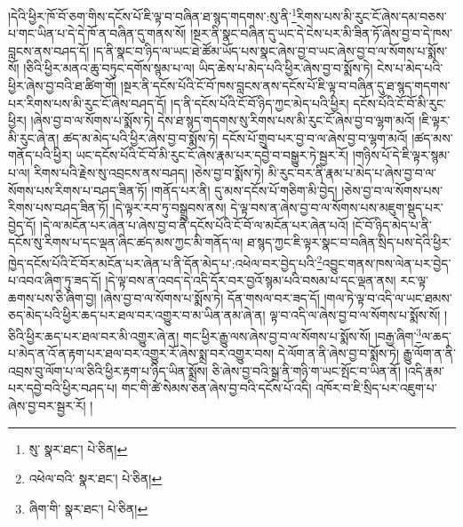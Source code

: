 །དེའི་ཕྱིར་ཁོ་བོ་ཅག་གིས་དངོས་པོ་ཇི་ལྟ་བ་བཞིན་ཐ་སྙད་གདགས་:སུ་ནི་\footnote{སུ་  སྣར་ཐང་།  པེ་ཅིན། }རིགས་པས་མི་རུང་ངོ་ཞེས་དམ་བཅས་པ་གང་ཡིན་པ་དེ་དེ་ཁོ་ན་བཞིན་དུ་གནས་སོ། །སྔར་ནི་སྣང་བཞིན་དུ་ཡང་དེ་ངེས་པར་མི་ཟིན་ཏོ་ཞེས་བྱ་བ་དེ་ཁས་བླངས་ནས་བཤད་དོ། །ད་ནི་སྣང་བ་ཉིད་ལ་ཡང་ཐེ་ཚོམ་ཡོད་པས་སྣང་ཞེས་བྱ་བ་ཡང་ཞེས་བྱ་བ་ལ་སོགས་པ་སྨོས་སོ། །ཅིའི་ཕྱིར་མནའ་ཆུ་བཏུང་དགོས་སྙམ་པ་ལ། ཡིད་ཆེས་པ་མེད་པའི་ཕྱིར་ཞེས་བྱ་བ་སྨོས་ཏེ། ངེས་པ་མེད་པའི་ཕྱིར་ཞེས་བྱ་བའི་ཐ་ཚིག་གོ། །སྔར་ནི་དངོས་པོའི་ངོ་བོ་ཁས་བླངས་ནས་དངོས་པོ་ཇི་ལྟ་བ་བཞིན་དུ་ཐ་སྙད་གདགས་པར་རིགས་པས་མི་རུང་ངོ་ཞེས་བཤད་དོ། །ད་ནི་དངོས་པོའི་ངོ་བོ་ཉིད་ཀྱང་མེད་པའི་ཕྱིར། དངོས་པོའི་ངོ་བོ་མི་རུང་ཕྱིར། །ཞེས་བྱ་བ་ལ་སོགས་པ་སྨོས་ཏེ། དེས་ཐ་སྙད་གདགས་སུ་རིགས་པས་མི་རུང་ངོ་ཞེས་བྱ་བ་ལྷག་མའོ། །ཇི་ལྟར་མི་རུང་ཞེ་ན། ཚད་མ་མེད་པའི་ཕྱིར་ཞེས་བྱ་བ་སྨོས་ཏེ། དངོས་པོ་གྲུབ་པར་བྱ་བ་ལ་ཞེས་བྱ་བ་ལྷག་མའོ། །ཚད་མས་གནོད་པའི་ཕྱིར། ཡང་དངོས་པོའི་ངོ་བོ་མི་རུང་ངོ་ཞེས་རྣམ་པར་དབྱེ་བ་བསྒྱུར་ཏེ་སྦྱར་རོ། །གཉིས་པོ་དེ་ཇི་ལྟར་སྙམ་པ་ལ། རིགས་པའི་རྗེས་སུ་འབྲངས་ནས་བཤད། །ཅེས་བྱ་བ་སྨོས་ཏེ། མི་རུང་བར་ནི་རྣམ་པ་མེད་པ་ཞེས་བྱ་བ་ལ་སོགས་པས་རིགས་པ་བཤད་ཟིན་ཏོ། །གནོད་པར་ནི། དུ་མས་དངོས་པོ་གཅིག་མི་བྱེད། །ཅེས་བྱ་བ་ལ་སོགས་པས་རིགས་པས་བཤད་ཟིན་ཏོ། །དེ་ལྟར་རབ་ཏུ་བསྒྲུབས་ནས། དེ་ལྟ་བས་ན་ཞེས་བྱ་བ་ལ་སོགས་པས་མཇུག་སྡུད་པར་བྱེད་དོ། །དེ་ལ་མངོན་པར་ཞེན་པ་ཞེས་བྱ་བ་ནི་དངོས་པོའི་ངོ་བོ་ལ་མངོན་པར་ཞེན་པའོ། །ངོ་བོ་ཉིད་མེད་པ་ནི་དངོས་སུ་རིགས་པ་དང་ལྡན་ཞིང་ཚད་མས་ཀྱང་མི་གནོད་ལ། ཐ་སྙད་ཀྱང་ཇི་ལྟར་སྣང་བ་བཞིན་སྲིད་པས་དེའི་ཕྱིར་ཁྱེད་དངོས་པོའི་ངོ་བོར་མངོན་པར་ཞེན་པ་ནི་དོན་མེད་པ་:འཕེལ་བར་བྱེད་པའི་\footnote{འཕེལ་བའི་  སྣར་ཐང་།  པེ་ཅིན། }འབྱུང་གནས་ཁས་ལེན་པར་བྱེད་པ་འབའ་ཞིག་ཏུ་ཟད་དོ། །དེ་ལྟ་བས་ན་འབད་དེ་འདི་དོར་བར་བྱའོ་སྙམ་པའི་བསམ་པ་དང་ལྡན་ནས། རང་ལྟ་ཆགས་པས་ཅི་ཞིག་བྱ། །ཞེས་བྱ་བ་ལ་སོགས་པ་སྨོས་ཏེ། དོན་གསལ་བར་ཟད་དོ། །གལ་ཏེ་ལྟ་བ་འདི་ལ་ཡང་ཐམས་ཅད་མེད་པའི་ཕྱིར་ཆད་པར་ཐལ་བར་འགྱུར་བ་མ་ཡིན་ནམ་ཞེ་ན། ལྟ་བ་འདི་ལ་ཞེས་བྱ་བ་ལ་སོགས་པ་སྨོས་སོ། །ཅིའི་ཕྱིར་ཆད་པར་ཐལ་བར་མི་འགྱུར་ཞེ་ན། གང་ཕྱིར་རྒྱུ་ལས་ཞེས་བྱ་བ་ལ་སོགས་པ་སྨོས་སོ། །བརྒྱ་ཞིག་\footnote{ཞིག་གི་  སྣར་ཐང་།  པེ་ཅིན། }ལ་ཆད་པ་མེད་ན་འོ་ན་རྟག་པར་ཐལ་བར་འགྱུར་རོ་ཞེས་སྨྲ་བར་འགྱུར་བས། དེ་ལོག་ན་ནི་ཞེས་བྱ་བ་སྨོས་ཏེ། རྒྱུ་ལོག་ན་ནི་འབྲས་བུ་ལོག་པ་ལ་ཅིའི་ཕྱིར་རྟག་པ་ཉིད་ཡིན་སྨྲོས། ཅི་ཞེས་བྱ་བའི་སྒྲ་ནི་གཉི་ག་ཡང་སྤོང་བ་ཡིན་ནོ། །འདི་རྣམ་པར་དབྱེ་བའི་ཕྱིར་བཤད་པ། གང་གི་ཚེ་སེམས་ཅན་ཞེས་བྱ་བའི་དངོས་པོ་འདི། འཁོར་བ་ཇི་སྲིད་པར་འཇུག་པ་ཞེས་བྱ་བར་སྦྱར་རོ། །
